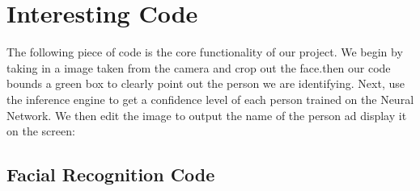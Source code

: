 \documentclass[onecolumn, draftclsnofoot,10pt, compsoc]{IEEEtran}
\begin{document}
\section{Interesting Code}

The following piece of code is the core functionality of our project. We begin by taking in a image taken from the camera and crop out the face.then our code bounds a green box to clearly point out the person we are identifying. Next, use the inference engine to get a confidence level of each person trained on the Neural Network. We then edit the image to output the name of the person ad display it on the screen: \\

    \subsection{Facial Recognition Code}
\end{document}
